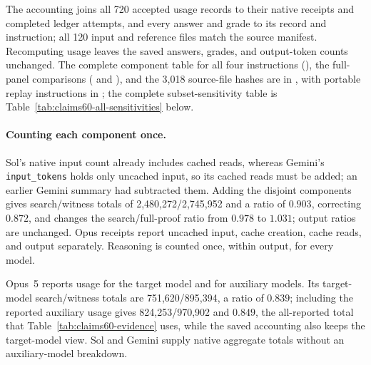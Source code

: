 \begin{table}[t]
\centering\small

\caption{The separate 60-statement panel. S is search, O an ordinary early-stop proof attempt, and W a proof attempt that must supply a counterexample. Confirmed-objection counts use the same reference-assisted grader. Ratios compare accepted-attempt token sums. Recorded total tokens are uncached input, cached input, and output (with reported reasoning counted once within output), including reported Opus auxiliary usage. Brackets are pointwise paired 95\% intervals; output uses 2,000 resamples and recorded totals 20,000.}
\label{tab:claims60-evidence}
\end{table}


The accounting joins all 720 accepted usage records to their native receipts and completed ledger attempts, and every answer and grade to its record and instruction; all 120 input and reference files match the source manifest. Recomputing usage leaves the saved answers, grades, and output-token counts unchanged. The complete component table for all four instructions (), the full-panel comparisons ( and ), and the 3,018 source-file hashes are in , with portable replay instructions in ; the complete subset-sensitivity table is Table~\ref{tab:claims60-all-sensitivities} below.

\paragraph{Counting each component once.}
Sol's native input count already includes cached reads, whereas Gemini's \texttt{input\_tokens} holds only uncached input, so its cached reads must be added; an earlier Gemini summary had subtracted them. Adding the disjoint components gives search/witness totals of 2,480,272/2,745,952 and a ratio of $0.903$, correcting $0.872$, and changes the search/full-proof ratio from $0.978$ to $1.031$; output ratios are unchanged. Opus receipts report uncached input, cache creation, cache reads, and output separately. Reasoning is counted once, within output, for every model.


Opus~5 reports usage for the target model and for auxiliary models. Its target-model search/witness totals are 751,620/895,394, a ratio of $0.839$; including the reported auxiliary usage gives 824,253/970,902 and $0.849$, the all-reported total that Table~\ref{tab:claims60-evidence} uses, while the saved accounting also keeps the target-model view. Sol and Gemini supply native aggregate totals without an auxiliary-model breakdown.


